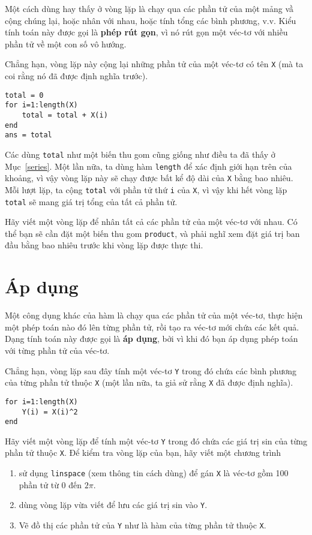 \documentclass[12pt]{book}
\begin{document}
Một cách dùng hay thấy ở vòng lặp là chạy qua các phần tử của một
mảng vầ cộng chúng lại, hoặc nhân với nhau, hoặc tính tổng các
bình phương, v.v. Kiểu tính toán này được gọi là {\bf phép rút gọn},
vì nó rút gọn một véc-tơ với nhiều phần tử về một con số vô hướng.

Chẳng hạn, vòng lặp này cộng lại những phần tử của một véc-tơ có tên
{\tt X} (mà ta coi rằng nó đã được định nghĩa trước).

\begin{verbatim}
total = 0
for i=1:length(X)
    total = total + X(i)
end
ans = total
\end{verbatim}
%
Các dùng {\tt total} như một biến thu gom cũng giống như điều ta đã
thấy ở Mục~\ref{series}.  Một lần nữa, ta dùng hàm {\tt length}
để xác định giới hạn trên của khoảng, vì vậy vòng lặp này sẽ chạy
được bất kể độ dài của {\tt X} bằng bao nhiêu. Mỗi lượt lặp, 
ta cộng {\tt total} với phần tử thứ {\tt i} của {\tt X}, 
vì vậy khi hết vòng lặp {\tt total} sẽ mang giá trị tổng của
tất cả phần tử.

\begin{ex}
Hãy viết một vòng lặp để nhân tất cả các phần tử của một véc-tơ
với nhau. Có thể bạn sẽ cần đặt một biến thu gom {\tt product}, 
và phải nghĩ xem đặt giá trị ban đầu bằng bao nhiêu trước khi
vòng lặp được thực thi.
\end{ex}


\section{Áp dụng}
\label{apply}

Một công dụng khác của hàm là chạy qua các phần tử của một
véc-tơ, thực hiện một phép toán nào đó lên từng phần tử, rồi
tạo ra véc-tơ mới chứa các kết quả. Dạng tính toán này được
gọi là {\bf áp dụng}, bởi vì khi đó bạn áp dụng phép toán với
từng phần tử của véc-tơ.

Chẳng hạn, vòng lặp sau đây tính một véc-tơ {\tt Y} trong đó
chứa các bình phương của từng phần tử thuộc {\tt X} 
(một lần nữa, ta giả sử rằng {\tt X} đã được định nghĩa).

\begin{verbatim}
for i=1:length(X)
    Y(i) = X(i)^2
end
\end{verbatim}
%
\begin{ex}
Hãy viết một vòng lặp để tính một véc-tơ {\tt Y} trong đó
chứa các giá trị sin của từng phần tử thuộc {\tt X}.  Để kiểm tra
vòng lặp của bạn, hãy viết một chương trình 

\begin{enumerate}

\item sử dụng {\tt linspace} (xem thông tin cách dùng) để gán
{\tt X} là véc-tơ gồm 100 phần tử từ 0 đến $2 \pi$.

\item dùng vòng lặp vừa viết để lưu các giá trị sin vào {\tt Y}.

\item Vẽ đồ thị các phần tử của {\tt Y} như là hàm của từng phần tử
thuộc {\tt X}.

\end{enumerate}
\end{ex}
\end{document}
